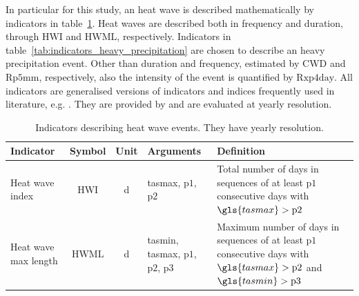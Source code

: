 In particular for this study, an heat wave is described mathematically by \glspl{indicator} in table~\ref{tab:indicators_heat_wave}. Heat waves are described both in frequency and duration, through $\mathrm{HWI}$ and $\mathrm{HWML}$, respectively.
Indicators in table~\ref{tab:indicators_heavy_precipitation} are chosen to describe an heavy precipitation event. Other than duration and frequency, estimated by $\mathrm{CWD}$ and $\mathrm{Rp5mm}$, respectively, also the intensity of the event is quantified by $\mathrm{Rxp4day}$.
All indicators are generalised versions of indicators and indices frequently used in literature, e.g. \cite[2208]{2021GutierrezAnnexVI}. They are provided by \cite{2023BourgaultXclimXarray-based} and are evaluated at yearly resolution.
\begin{table}
  \renewcommand*{\arraystretch}{1.5}
  \centering
  \caption{Indicators describing heat wave events. They have yearly resolution.}
  \label{tab:indicators_heat_wave}
  \begin{tabular}{p{}ccp{}p{}}
    Indicator            & Symbol          & Unit        & Arguments                                                               & Definition                                                                                                                                        \\
    \hline
    Heat wave index      & $\mathrm{HWI}$  & \unit{\day} & \gls{tasmax}, $\mathrm{p1}$, $\mathrm{p2}$                              & Total number of days in sequences of at least $\mathrm{p1}$ consecutive days with $\gls{tasmax} > \mathrm{p2}$                                    \\
    Heat wave max length & $\mathrm{HWML}$ & \unit{\day} & \gls{tasmin}, \gls{tasmax}, $\mathrm{p1}$, $\mathrm{p2}$, $\mathrm{p3}$ & Maximum number of days in sequences of at least $\mathrm{p1}$ consecutive days with $\gls{tasmax} > \mathrm{p2}$ and $\gls{tasmin} > \mathrm{p3}$ \\
  \end{tabular}
\end{table}
